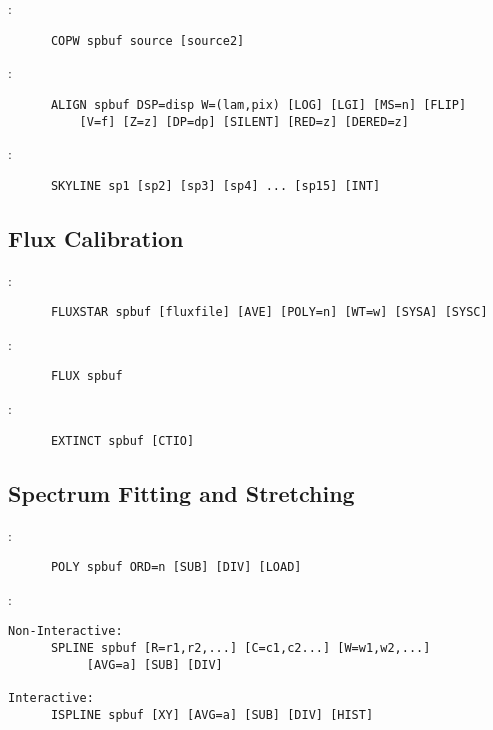 \noindent {}:
\begin{verbatim}
      COPW spbuf source [source2]
\end{verbatim}

\noindent {}:
\begin{verbatim}
      ALIGN spbuf DSP=disp W=(lam,pix) [LOG] [LGI] [MS=n] [FLIP]
		  [V=f] [Z=z] [DP=dp] [SILENT] [RED=z] [DERED=z]
\end{verbatim}

\noindent {}:
\begin{verbatim}
      SKYLINE sp1 [sp2] [sp3] [sp4] ... [sp15] [INT]
\end{verbatim}

\subsection{Flux Calibration}

:
\begin{verbatim}
      FLUXSTAR spbuf [fluxfile] [AVE] [POLY=n] [WT=w] [SYSA] [SYSC]
\end{verbatim}

\noindent {}:
\begin{verbatim}
      FLUX spbuf
\end{verbatim}

\noindent {}:
\begin{verbatim}
      EXTINCT spbuf [CTIO]
\end{verbatim}

\subsection{Spectrum Fitting and Stretching}

:
\begin{verbatim}
      POLY spbuf ORD=n [SUB] [DIV] [LOAD]
\end{verbatim}

\noindent {}:
\begin{verbatim}
Non-Interactive:
      SPLINE spbuf [R=r1,r2,...] [C=c1,c2...] [W=w1,w2,...]
		   [AVG=a] [SUB] [DIV]

Interactive:
      ISPLINE spbuf [XY] [AVG=a] [SUB] [DIV] [HIST]
\end{verbatim}

